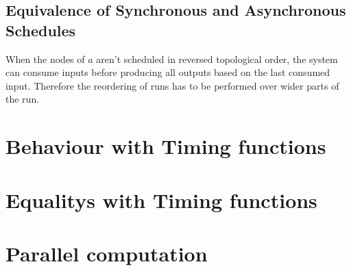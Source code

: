 \subsection{Equivalence of Synchronous and Asynchronous Schedules}
\label{sec:concepts:equivalence_without_timing:sync_async}

When the nodes of \(a\) aren't scheduled in reversed topological order, the system can consume inputs before producing all outputs based on the last consumed input.
Therefore the reordering of runs has to be performed over wider parts of the run.

\section{Behaviour with Timing functions}
\section{Equalitys with Timing functions}
\section{Parallel computation}
